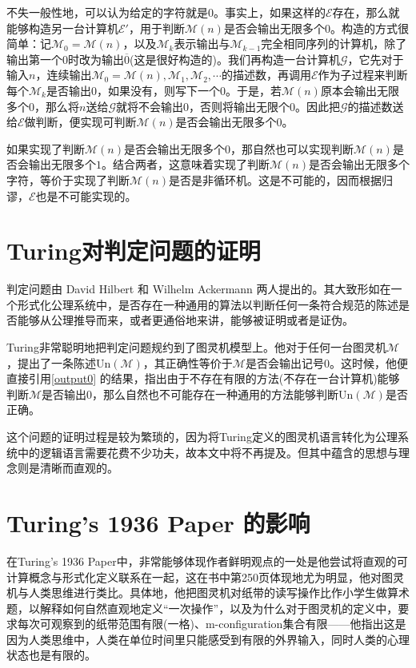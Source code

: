 \documentclass[8pt]{article}
\begin{document}
不失一般性地，可以认为给定的字符就是$0$。事实上，如果这样的$\mathcal E$存在，那么就能够构造另一台计算机$\mathcal E'$，用于判断$\mathcal M(n)$是否会输出无限多个$0$。构造的方式很简单：记$\mathcal M_0 = \mathcal M(n)$，以及$\mathcal M_k$表示输出与$\mathcal M_{k-1}$完全相同序列的计算机，除了输出第一个$0$时改为输出$\overline{0}$(这是很好构造的)。我们再构造一台计算机$\mathcal G$，它先对于输入$n$，连续输出$\mathcal M_0 = \mathcal M(n), \mathcal M_1, \mathcal M_2, \cdots$的描述数，再调用$\mathcal E$作为子过程来判断每个$\mathcal M_k$是否输出$0$，如果没有，则写下一个$0$。于是，若$\mathcal M(n)$原本会输出无限多个$0$，那么将$n$送给$\mathcal G$就将不会输出$0$，否则将输出无限个$0$。因此把$\mathcal G$的描述数送给$\mathcal E$做判断，便实现可判断$\mathcal M(n)$是否会输出无限多个$0$。

如果实现了判断$\mathcal M(n)$是否会输出无限多个$0$，那自然也可以实现判断$\mathcal M(n)$是否会输出无限多个$1$。结合两者，这意味着实现了判断$\mathcal M(n)$是否会输出无限多个字符，等价于实现了判断$\mathcal M(n)$是否是非循环机。这是不可能的，因而根据归谬，$\mathcal E$也是不可能实现的。

\section{Turing对判定问题的证明}

判定问题由 David Hilbert 和 Wilhelm Ackermann 两人提出的。其大致形如在一个形式化公理系统中，是否存在一种通用的算法以判断任何一条符合规范的陈述是否能够从公理推导而来，或者更通俗地来讲，能够被证明或者是证伪。

Turing非常聪明地把判定问题规约到了图灵机模型上。他对于任何一台图灵机$\mathcal M$，提出了一条陈述$\mathrm{Un}(\mathcal M)$，其正确性等价于$\mathcal M$是否会输出记号$0$。这时候，他便直接引用\cref{output0} 的结果，指出由于不存在有限的方法(不存在一台计算机)能够判断$\mathcal M$是否输出$0$，那么自然也不可能存在一种通用的方法能够判断$\mathrm{Un}(\mathcal M)$是否正确。

这个问题的证明过程是较为繁琐的，因为将Turing定义的图灵机语言转化为公理系统中的逻辑语言需要花费不少功夫，故本文中将不再提及。但其中蕴含的思想与理念则是清晰而直观的。

\section{Turing's 1936 Paper 的影响}

在Turing's 1936 Paper中，非常能够体现作者鲜明观点的一处是他尝试将直观的可计算概念与形式化定义联系在一起，这在书中第250页体现地尤为明显，他对图灵机与人类思维进行类比。具体地，他把图灵机对纸带的读写操作比作小学生做算术题，以解释如何自然直观地定义“一次操作”，以及为什么对于图灵机的定义中，要求每次可观察到的纸带范围有限(一格)、m-configuration集合有限——他指出这是因为人类思维中，人类在单位时间里只能感受到有限的外界输入，同时人类的心理状态也是有限的。
\end{document}
